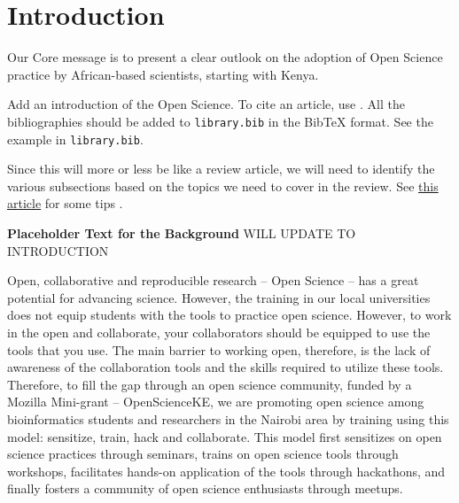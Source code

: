 \section*{Introduction}\label{introduction}

Our Core message is to present a clear outlook on the adoption of Open
Science practice by African-based scientists, starting with Kenya.

Add an introduction of the Open Science. To cite an article, use
\cite{Schlegel2016}. All the bibliographies should be added to
\texttt{library.bib} in the BibTeX format. See the example in
\texttt{library.bib}.

Since this will more or less be like a review article, we will need to
identify the various subsections based on the topics we need to cover in
the review. See
\href{http://journals.plos.org/ploscompbiol/article?id=10.1371/journal.pcbi.1005619}{this
article} for some tips \cite{Mensh2017}.

\textbf{Placeholder Text for the Background} WILL UPDATE TO INTRODUCTION

Open, collaborative and reproducible research -- Open Science -- has a
great potential for advancing science. However, the training in our
local universities does not equip students with the tools to practice
open science. However, to work in the open and collaborate, your
collaborators should be equipped to use the tools that you use. The main
barrier to working open, therefore, is the lack of awareness of the
collaboration tools and the skills required to utilize these tools.
Therefore, to fill the gap through an open science community, funded by
a Mozilla Mini-grant -- OpenScienceKE, we are promoting open science
among bioinformatics students and researchers in the Nairobi area by
training using this model: sensitize, train, hack and collaborate. This
model first sensitizes on open science practices through seminars,
trains on open science tools through workshops, facilitates hands-on
application of the tools through hackathons, and finally fosters a
community of open science enthusiasts through meetups.

